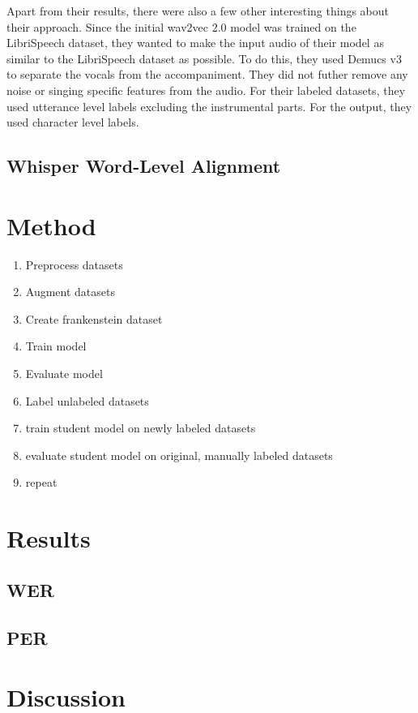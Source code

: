 \documentclass[letterpaper, 12pt]{article}
\begin{document}
\begin{multicols*}{2}
Apart from their results, there were also a few other interesting things about their approach. Since
the initial wav2vec 2.0 model was trained on the LibriSpeech dataset, they wanted to make the input
audio of their model as similar to the LibriSpeech dataset as possible. To do this, they used
Demucs v3 \cite{Demux} to separate the vocals from the accompaniment. They did not futher remove any
noise or singing specific features from the audio. For their labeled datasets, they used
utterance level labels excluding the instrumental parts. For the output, they used character level
labels.


\subsection{Whisper Word-Level Alignment}

\section{Method}
\begin{enumerate}
    \item Preprocess datasets
    \item Augment datasets
    \item Create frankenstein dataset
    \item Train model
    \item Evaluate model
    \item Label unlabeled datasets
    \item train student model on newly labeled datasets
    \item evaluate student model on original, manually labeled datasets
    \item repeat
\end{enumerate}

\section{Results}

\subsection{WER}

\subsection{PER}

\section{Discussion}


\end{multicols*}
\end{document}
